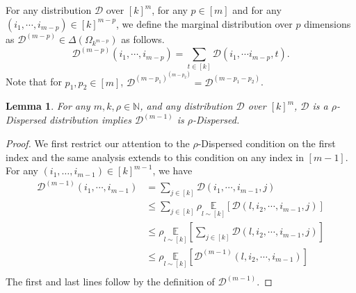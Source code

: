 \documentclass[11pt]{article}
\newtheorem{lemma}[theorem]{Lemma}
\newcommand{\sD}{\mathcal{D}}
\begin{document}
For any distribution $\sD$ over $[k]^{m}$, for any $p\in [m]$ and for any $(i_{1},\cdots,i_{m-p})\in [k]^{m-p}$, we define the marginal distribution over $p$ dimensions as  $\mathcal{D}^{(m-p)}\in \Delta(\Omega_{k^{m-p}})$ as follows.
\begin{equation*}
    \sD^{(m-p)}(i_{1},\cdots, i_{m-p})=\sum_{t\in [k]}\sD(i_{1},\cdots i_{m-p},t).
\end{equation*}
\noindent Note that for $p_{1},p_{2}\in [m]$, $\sD^{(m-p_{1})^{(m-p_{2})}}=\sD^{(m-p_{1}-p_{2})}$.

\begin{lemma}\label{lem:fold_dispersed}
    For any $m,k,\rho\in \mathbb{N}$, and any distribution $\sD$ over $[k]^{m}$, $\sD$ is a $\rho$-Dispersed distribution implies $\sD^{(m-1)}$ is $\rho$-Dispersed.
\end{lemma}

\begin{proof}
    We first restrict our attention to the $\rho$-Dispersed condition on the first index and the same analysis extends to this condition on any index in $[m-1]$. For any $(i_1, \dots, i_{m-1}) \in [k]^{m-1}$, we have
    \[
    \begin{split}
        \sD^{(m-1)}(i_{1},\cdots, i_{m-1})&=\sum_{j\in [k]}\sD(i_{1},\cdots, i_{m-1},j)\\
        &\leq \sum_{j\in [k]}\rho\underset{{l\sim [k]}}{\mathbb{E}}[\sD(l,i_{2},\cdots, i_{m-1}, j)]\\
        &\leq \rho\underset{{l\sim [k]}}{\mathbb{E}}\left[\sum_{j\in [k]}\sD(l,i_{2},\cdots, i_{m-1}, j)\right]\\
        & \leq\rho \underset{{l\sim [k]}}{\mathbb{E}}[\sD^{(m-1)}(l,i_{2},\cdots, i_{m-1})]\\
    \end{split}
    \]
    The first and last lines follow by the definition of $\sD^{(m-1)}$. 
\end{proof}
\end{document}
